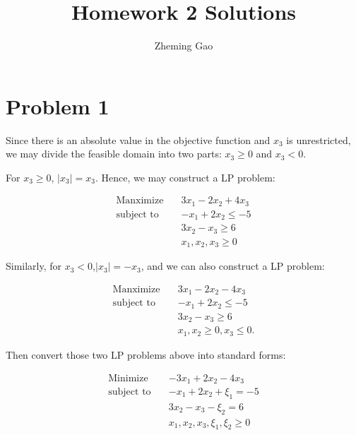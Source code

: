 \documentclass[12pt]{article}
\begin{document}
 
 
\title{Homework 2 Solutions}
\author{Zheming Gao}
\maketitle


\section*{Problem 1}

Since there is an absolute value in the objective function and $x_3$ is unrestricted, we may divide the feasible domain into two parts: $x_3 \geqslant 0$ and $x_3 < 0$.

For $x_3 \geqslant 0$, $|x_3| = x_3$. Hence, we may construct a LP problem:

\begin{equation*}
\begin{aligned}
\text{Manximize} \quad & 3x_1 - 2x_2 + 4 x_3 \\
\text{subject\  to} \quad & -x_1 + 2 x_2 \leqslant -5 \\
& 3 x_2 - x_3 \geqslant 6 \\
& x_1, x_2, x_3 \geqslant 0
\end{aligned}
\end{equation*}

Similarly, for $x_3 < 0$,$|x_3| = -x_3$, and we can also construct a LP problem:

\begin{equation*}
\begin{aligned}
\text{Manximize} \quad & 3x_1 - 2x_2 - 4 x_3 \\
\text{subject\  to} \quad & -x_1 + 2 x_2 \leqslant -5 \\
& 3 x_2 - x_3 \geqslant 6 \\
& x_1, x_2 \geqslant 0, x_3 \leqslant 0.
\end{aligned}
\end{equation*}

Then convert those two LP problems above into standard forms:

\begin{equation}\label{L1}
\begin{aligned}
\text{Minimize} \quad & -3x_1 + 2x_2 - 4 x_3 \\
\text{subject\  to} \quad & -x_1 + 2 x_2 + \xi_1 = -5 \\
& 3 x_2 - x_3 - \xi_2 = 6 \\
& x_1, x_2, x_3, \xi_1, \xi_2 \geqslant 0
\end{aligned}
\end{equation}
\end{document}
